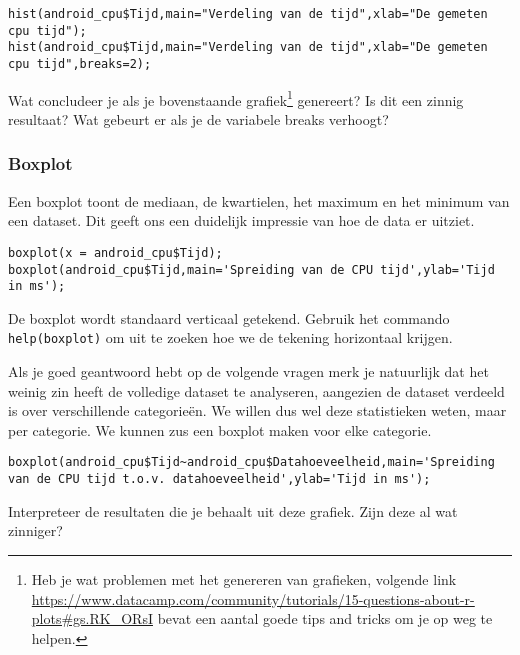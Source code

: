 \begin{lstlisting}
hist(android_cpu$Tijd,main="Verdeling van de tijd",xlab="De gemeten cpu tijd");
hist(android_cpu$Tijd,main="Verdeling van de tijd",xlab="De gemeten cpu tijd",breaks=2);
\end{lstlisting}
\begin{exercise}
	Wat concludeer je als je bovenstaande grafiek\footnote{Heb je wat problemen met het genereren van grafieken, volgende link \url{https://www.datacamp.com/community/tutorials/15-questions-about-r-plots\#gs.RK_ORsI} bevat een aantal goede tips and tricks om je op weg te helpen.} genereert? Is dit een zinnig resultaat? Wat gebeurt er als je de variabele breaks verhoogt?
\end{exercise}

\subsubsection{Boxplot}
Een boxplot toont de mediaan, de kwartielen, het maximum en het minimum van een dataset. Dit geeft ons een duidelijk impressie van hoe de data er uitziet.

\begin{lstlisting}
boxplot(x = android_cpu$Tijd);
boxplot(android_cpu$Tijd,main='Spreiding van de CPU tijd',ylab='Tijd in ms');
\end{lstlisting} 

\begin{exercise}
	De boxplot wordt standaard verticaal getekend. Gebruik het commando \texttt{help(boxplot)} om uit te zoeken hoe we de tekening horizontaal krijgen. 
\end{exercise}

Als je goed geantwoord hebt op de volgende vragen merk je natuurlijk dat het weinig zin heeft de volledige dataset te analyseren, aangezien de dataset verdeeld is over verschillende categorie\"en. We willen dus wel deze statistieken weten, maar per categorie. We kunnen zus een boxplot maken voor elke categorie.

\begin{lstlisting}
boxplot(android_cpu$Tijd~android_cpu$Datahoeveelheid,main='Spreiding van de CPU tijd t.o.v. datahoeveelheid',ylab='Tijd in ms');
\end{lstlisting}

\begin{exercise}
	\label{ex:boxplot}
	Interpreteer de resultaten die je behaalt uit deze grafiek. Zijn deze al wat zinniger?
\end{exercise}

